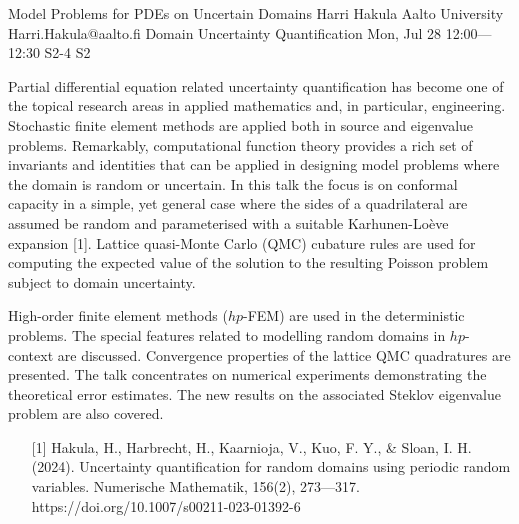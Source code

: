 \begin{talk}
  {Model Problems for PDEs on Uncertain Domains}%
  {Harri Hakula}%
  {Aalto University}%
  {Harri.Hakula@aalto.fi}%
  {Domain Uncertainty Quantification}%
  {}%
  {Mon, Jul 28 12:00---12:30}%
  {S2-4}%
  {S2}%
    
   
Partial differential equation related uncertainty quantification has become one of the
topical research areas in applied mathematics and, in particular, engineering.
Stochastic finite element methods are applied both in source and eigenvalue problems.
Remarkably, computational function theory provides a rich set of invariants 
and identities that
can be applied in designing model problems where the domain is random or uncertain. 
In this talk the focus is on conformal capacity in a simple, 
yet general case where the sides of a quadrilateral are assumed be random 
and parameterised with a suitable Karhunen-Lo\`eve expansion [1].
Lattice quasi-Monte Carlo (QMC) cubature rules are used for computing the expected value of the solution to the resulting Poisson problem subject to domain uncertainty. 

High-order finite element methods ($hp$-FEM) are used in the deterministic problems.
The special features related to modelling random domains in $hp$-context are discussed.
Convergence properties of the lattice QMC quadratures are presented. The talk
concentrates on numerical experiments demonstrating the theoretical error estimates.
The new results on the associated Steklov eigenvalue problem are also covered.


\medskip

\begin{enumerate}
 \item[{[1]}] Hakula, H., Harbrecht, H., Kaarnioja, V., Kuo, F. Y., \& Sloan, I. H. (2024). Uncertainty quantification for random domains using periodic random variables. Numerische Mathematik, 156(2), 273---317. https://doi.org/10.1007/s00211-023-01392-6
\end{enumerate}

\end{talk}

